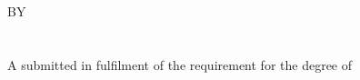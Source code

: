 \documentclass[a4paper]{memoir}
\begin{document}
\thispagestyle{empty}

\fontsize{17bp}{19bp}\selectfont
\begin{center}
\MakeUppercase{\myTitle}\\
\ifdefined\mySubtitle
\MakeUppercase{\mySubtitle}\\~\\
\else
\\~\\
\fi
\vfill
BY\\~\\
\vfill
\MakeTextUppercase{\myName}\\
\vfill
A \myDocument submitted in fulfilment of the requirement for the degree of 
\myDegree
\vfill
\myKulliyyah\\
\myUni\\
\vfill
\MakeTextUppercase{\myTime}
\end{center}

\end{document}
